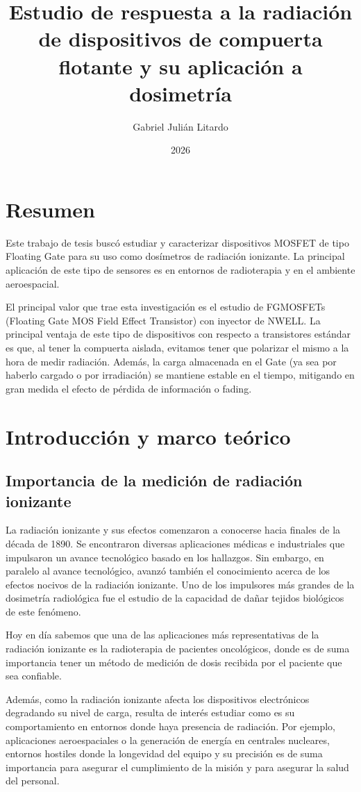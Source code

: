 \documentclass[12pt,a4paper,oneside]{book}
\title{Estudio de respuesta a la radiación de dispositivos de compuerta flotante y su aplicación a dosimetría}
\author{Gabriel Julián Litardo}
\date{2026}
\begin{document}

\tableofcontents

\chapter*{Resumen}Este trabajo de tesis buscó estudiar y caracterizar dispositivos MOSFET de tipo Floating Gate para su uso como dosímetros de radiación ionizante. La principal aplicación de este tipo de sensores es en entornos de radioterapia y en el ambiente aeroespacial.

El principal valor que trae esta investigación es el estudio de FGMOSFETs (Floating Gate MOS Field Effect Transistor) con inyector de NWELL. La principal ventaja de este tipo de dispositivos con respecto a transistores estándar es que, al tener la compuerta aislada, evitamos tener que polarizar el mismo a la hora de medir radiación. Además, la carga almacenada en el Gate (ya sea por haberlo cargado o por irradiación) se mantiene estable en el tiempo, mitigando en gran medida el efecto de pérdida de información o fading.

\chapter{Introducción y marco teórico}

\section{Importancia de la medición de radiación ionizante}
La radiación ionizante y sus efectos comenzaron a conocerse hacia finales de la década de 1890. Se encontraron diversas aplicaciones médicas e industriales que impulsaron un avance tecnológico basado en los hallazgos. Sin embargo, en paralelo al avance tecnológico, avanzó también el conocimiento acerca de los efectos nocivos de la radiación ionizante. Uno de los impulsores más grandes de la dosimetría radiológica fue el estudio de la capacidad de dañar tejidos biológicos de este fenómeno.

Hoy en día sabemos que una de las aplicaciones más representativas de la radiación ionizante es la radioterapia de pacientes oncológicos, donde es de suma importancia tener un método de medición de dosis recibida por el paciente que sea confiable.

Además, como la radiación ionizante afecta los dispositivos electrónicos degradando su nivel de carga, resulta de interés estudiar como es su comportamiento en entornos donde haya presencia de radiación. Por ejemplo, aplicaciones aeroespaciales o la generación de energía en centrales nucleares, entornos hostiles donde la longevidad del equipo y su precisión es de suma importancia para asegurar el cumplimiento de la misión y para asegurar la salud del personal.
\end{document}
